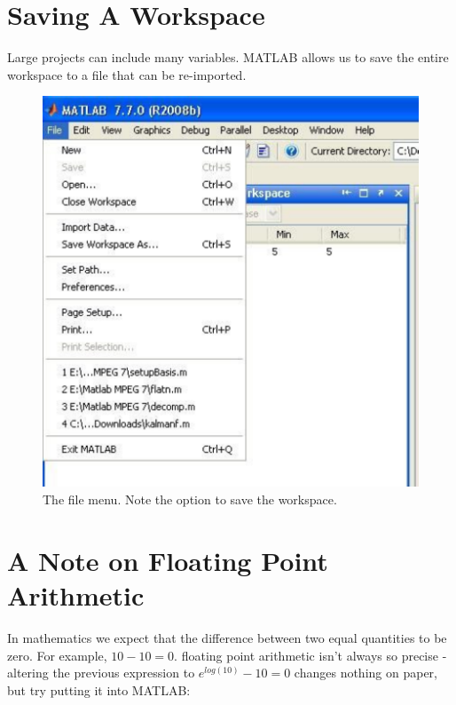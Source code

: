 \section*{Saving A Workspace}

Large projects can include many variables.  MATLAB allows us to save the entire workspace to a file that can be re-imported.


\begin{figure}
\begin{center}
	\includegraphics[scale=0.5]{./Figures/saveWorkspace}
	\caption{The file menu. Note the option to save the workspace.}
\end{center}
\end{figure}

\section*{A Note on Floating Point Arithmetic}

In mathematics we expect that the difference between two equal quantities to be zero.  For example, $10 - 10 = 0$.  floating point arithmetic isn't always so precise - altering the previous expression to $e^{log(10)} - 10 = 0$ changes nothing on paper, but try putting it into MATLAB:

